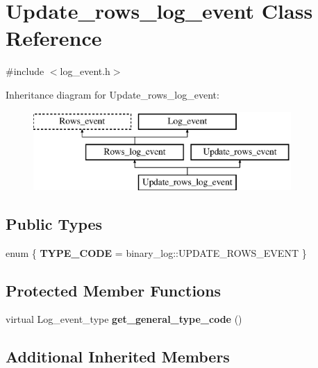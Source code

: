\hypertarget{classUpdate__rows__log__event}{}\section{Update\+\_\+rows\+\_\+log\+\_\+event Class Reference}
\label{classUpdate__rows__log__event}


{\ttfamily \#include $<$log\+\_\+event.\+h$>$}

Inheritance diagram for Update\+\_\+rows\+\_\+log\+\_\+event\+:\begin{figure}[H]
\begin{center}
\leavevmode
\includegraphics[height=3.000000cm]{classUpdate__rows__log__event}
\end{center}
\end{figure}
\subsection*{Public Types}
\begin{DoxyCompactItemize}
\item 
\mbox{\label{classUpdate__rows__log__event_a0fa80e9b99c99c1cda855066a559212e}} 
enum \{ {\bfseries T\+Y\+P\+E\+\_\+\+C\+O\+DE} = binary\+\_\+log\+:\+:U\+P\+D\+A\+T\+E\+\_\+\+R\+O\+W\+S\+\_\+\+E\+V\+E\+NT
 \}
\end{DoxyCompactItemize}
\subsection*{Protected Member Functions}
\begin{DoxyCompactItemize}
\item 
\mbox{\label{classUpdate__rows__log__event_a0ee18bea9dd6052e488a5750a70b8478}} 
virtual Log\+\_\+event\+\_\+type {\bfseries get\+\_\+general\+\_\+type\+\_\+code} ()
\end{DoxyCompactItemize}
\subsection*{Additional Inherited Members}


